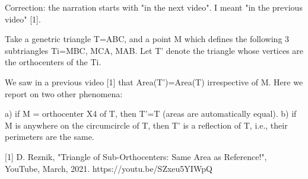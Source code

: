 Correction: the narration starts with "in the next video". I meant "in the previous video" [1]. 

Take a genetric triangle T=ABC, and a point M which defines the following 3 subtriangles Ti={MBC, MCA, MAB}. Let T' denote the triangle whose vertices are the orthocenters of the Ti.

We saw in a previous video [1] that Area(T')=Area(T) irrespective of M. Here we report on two other phenomena:

a) if M = orthocenter X4 of T, then T'=T (areas are automatically equal).
b) if M is anywhere on the circumcircle of T, then T' is a reflection of T, i.e., their perimeters are the same.

[1] D. Reznik, "Triangle of Sub-Orthocenters: Same Area as Reference!", YouTube, March, 2021. https://youtu.be/SZxeu5YIWpQ